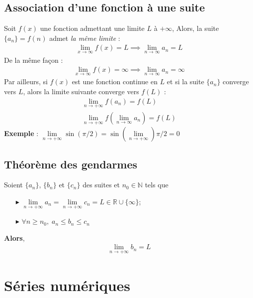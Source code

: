 \documentclass{report}
\begin{document}
\begin{multicols*}{3}
    \section{Association d'une fonction à une suite}
        Soit $f\left(x\right)$ une fonction admettant une limite $L$ à 
        $\text{+}\infty$, Alors, la suite 
        $\{a_n\} = f\left(n\right)$ admet \textit{la même limite} : 
        \begin{align*}
          \lim\limits_{x\to\infty  }f(x) = L \implies \lim\limits_{n\to\infty  }a_n = L
        \end{align*}
        De la même façon :
        \begin{align*}
          \lim\limits_{x\to\infty  }f(x) = \infty \implies \lim\limits_{n\to\infty  }a_n = \infty
        \end{align*}
        Par ailleurs, si $f\left(x\right)$ est une fonction continue en 
        $L$ et si la suite $\{a_n\}$
        converge vers $L$, alors la limite suivante converge vers $f\left(L\right)$ :
        \begin{align*}
                    \lim\limits_{n\to+\infty  }f(a_n)  = f(L) \\ 
                    \lim\limits_{n\to+\infty  }f(\lim\limits_{n \to \infty} a_n)  
                    = f(L)  
        \end{align*}
        \textbf{Exemple} :  $\lim\limits_{n \to+\infty }\sin(\pi/2)  = 
        \sin(\lim\limits_{n \to+\infty })  \pi/2  = 0$


    \section{Théorème des gendarmes}{}
        Soient $\{a_n\}$, $\{b_n\}$ et $\{c_n\}$ des suites et $n_0 \in \mathbb{N}$ tels 
        que
        \begin{itemize}
            \item[$\blacktriangleright$ ]  $\lim\limits_{n\to+\infty }a_n  = 
                \lim\limits_{n\to+\infty }c_n  = L 
                \in \mathbb{R} \cup \{\infty \}$; 
            \item[$\blacktriangleright$ ] $\forall n \geq n_0, \; a_n \leq b_n \leq c_n$ 
        \end{itemize}
        \textbf{Alors},
        \begin{align*}
            \lim\limits_{n\to+\infty}b_n  = L                   
        \end{align*}


    \chapter{Séries numériques}


\end{multicols*}
\end{document}
